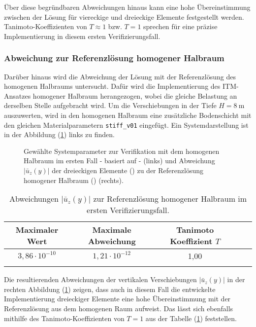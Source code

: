 Über diese begründbaren Abweichungen hinaus kann eine hohe Übereinstimmung zwischen der Lösung für viereckige und dreieckige Elemente festgestellt werden. Tanimoto-Koeffizienten von $T \approx 1$ bzw. $T = 1$ sprechen für eine präzise Implementierung in diesem ersten Verifizierungsfall.


\subsubsection{Abweichung zur Referenzlösung homogener Halbraum}
Darüber hinaus wird die Abweichung der Lösung mit der Referenzlösung des homogenen Halbraums untersucht. Dafür wird die Implementierung des ITM-Ansatzes homogener Halbraum herangezogen, wobei die gleiche Belastung an derselben Stelle aufgebracht wird. Um die Verschiebungen in der Tiefe $H = 8\ \mathrm{m}$ auszuwerten, wird in den homogenen Halbraum eine zusätzliche Bodenschicht mit den gleichen Materialparametern \texttt{stiff\_v01} eingefügt. Ein Systemdarstellung ist in der Abbildung (\ref{fig:c1_homog}) links zu finden.
\begin{figure}[H]
	\centering
  \begin{subfigure}[t]{0.49\linewidth}
	\centering
	\raisebox{12mm}{%
		\hspace*{9mm}%
		\makebox[\linewidth][c]{}
	}
\end{subfigure}\hfill
	\begin{subfigure}{0.49\linewidth}
		\centering
		
	\end{subfigure}
	\caption{Gewählte Systemparameter zur Verifikation mit dem homogenen Halbraum im ersten Fall - basiert auf \cite{Freisinger2022} - (links) und Abweichung $|\bar{u}_z(y)|$ der dreieckigen Elemente (\legThree) zu der Referenzlösung homogener Halbraum (\legFour) (rechts).}
	\label{fig:c1_homog}
\end{figure}
\begin{table}[htb]
	\centering
	\normalsize
	{\renewcommand{\arraystretch}{1.15}
		\begin{tabular}{ccccc}
			\firsthline
			Maximaler Wert & Maximale Abweichung & Tanimoto Koeffizient $T$ \\\hline
			$3,86\cdot10^{-10}$ & $1,21\cdot10^{-12}$ & 1,00 \\\lasthline
	\end{tabular}}
	\caption{Abweichungen $|\bar{u}_z(y)|$ zur Referenzlösung homogener Halbraum im ersten Verifizierungsfall.}
	\label{tab:Fehlermessung_c1homog}
\end{table}
Die resultierenden Abweichungen der vertikalen Verschiebungen $|\bar{u}_z(y)|$ in der rechten Abbildung (\ref{fig:c1_homog}) zeigen, dass auch in diesem Fall die entwickelte Implementierung dreieckiger Elemente eine hohe Übereinstimmung mit der Referenzlösung aus dem homogenen Raum aufweist.
Das lässt sich ebenfalls mithilfe des Tanimoto-Koeffizienten von $T = 1$ aus der Tabelle (\ref{tab:Fehlermessung_c1homog}) feststellen.

